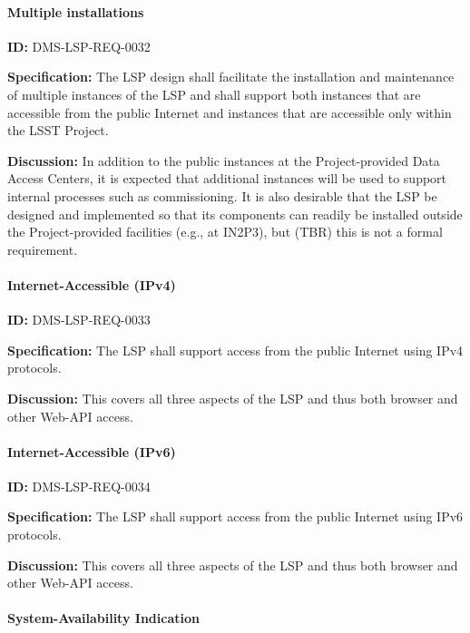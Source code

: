 \documentclass[SE,toc,lsstdraft]{lsstdoc}
\begin{document}
\paragraph{Multiple installations}\hfill  %

\label{DMS-LSP-REQ-0032}
\textbf{ID:} DMS-LSP-REQ-0032

\textbf{Specification:}
The LSP design shall facilitate the installation and maintenance of multiple instances of the LSP and shall support both instances that are accessible from the public Internet and instances that are accessible only within the LSST Project.

\textbf{Discussion:}
In addition to the public instances at the Project-provided Data Access Centers, it is expected that additional instances will be used to support internal processes such as commissioning.
It is also desirable that the LSP be designed and implemented so that its components can readily be installed outside the Project-provided facilities (e.g., at IN2P3), but (TBR) this is not a formal requirement.

\paragraph{Internet-Accessible (IPv4)}\hfill  %

\label{DMS-LSP-REQ-0033}
\textbf{ID:} DMS-LSP-REQ-0033

\textbf{Specification:}
The LSP shall support access from the public Internet using IPv4 protocols.

\textbf{Discussion:}
This covers all three aspects of the LSP and thus both browser and other Web-API access.

\paragraph{Internet-Accessible (IPv6)}\hfill  %

\label{DMS-LSP-REQ-0034}
\textbf{ID:} DMS-LSP-REQ-0034

\textbf{Specification:}
The LSP shall support access from the public Internet using IPv6 protocols.

\textbf{Discussion:}
This covers all three aspects of the LSP and thus both browser and other Web-API access.

\paragraph{System-Availability Indication}\hfill  %
\end{document}
